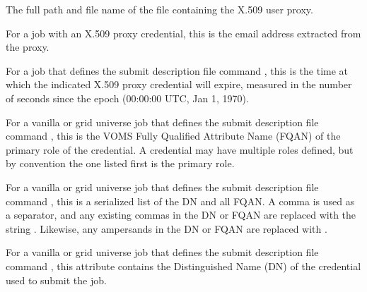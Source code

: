 \begin{description}
\item[\AdAttr{X509UserProxy}:]   
The full path and file name of the file containing the X.509 user proxy.

\item[\AdAttr{X509UserProxyEmail}:]   
\item For a job with an X.509 proxy credential, this is the email
address extracted from the proxy.

\item[\AdAttr{X509UserProxyExpiration}:]   
For a job that defines the submit description file command
, this is the time at which the indicated
X.509 proxy credential will expire, measured in the
number of seconds since the epoch (00:00:00 UTC, Jan 1, 1970).

\item[\AdAttr{X509UserProxyFirstFQAN}:]   
For a vanilla or grid universe job that defines the submit description
file command , 
this is the VOMS Fully Qualified Attribute Name (FQAN) of
the primary role of the credential. 
A credential may have multiple roles defined, 
but by convention the one listed first is the primary role. 

\item[\AdAttr{X509UserProxyFQAN}:]   
For a vanilla or grid universe job that defines the submit description
file command , 
this is a serialized list of the DN and all FQAN.
A comma is used as a separator,
and any existing commas in the DN or FQAN are replaced with the string
.
Likewise, any ampersands in the DN or FQAN are replaced with
.

\item[\AdAttr{X509UserProxySubject}:]   
For a vanilla or grid universe job that defines the submit description
file command , 
this attribute contains the Distinguished Name (DN) of the credential
used to submit the job.


\end{description}
